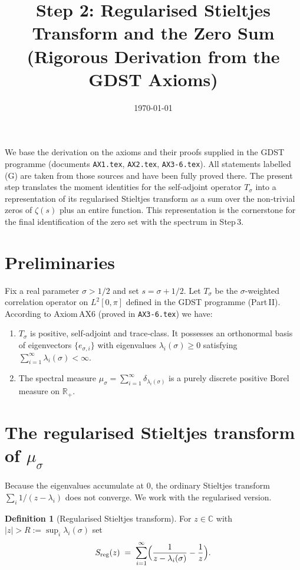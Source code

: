 \documentclass[11pt,a4paper]{article}
\title{\bf Step 2: Regularised Stieltjes Transform and the Zero Sum\\
(Rigorous Derivation from the GDST Axioms)}
\author{}
\date{\today}
\theoremstyle{definition}
\newtheorem{definition}[theorem]{Definition}
\newcommand{\C}{\mathbb{C}}
\newcommand{\R}{\mathbb{R}}
\newcommand{\TOp}{T}
\begin{document}
\maketitle

\noindent
We base the derivation on the axioms and their proofs supplied in the
GDST programme (documents \texttt{AX1.tex}, \texttt{AX2.tex},
\texttt{AX3‑6.tex}).  All statements labelled \textsc{(G)} are taken from
those sources and have been fully proved there.  
The present step translates the moment identities for the self‑adjoint
operator \(\TOp_\sigma\) into a representation of its regularised
Stieltjes transform as a sum over the non‑trivial zeros of \(\zeta(s)\)
plus an entire function.  This representation is the cornerstone for
the final identification of the zero set with the spectrum in Step 3.

\section{Preliminaries}
Fix a real parameter \(\sigma > 1/2\) and set \(s = \sigma + 1/2\).
Let \(\TOp_\sigma\) be the \(\sigma\)-weighted correlation operator on
\(L^2[0,\pi]\) defined in the GDST programme (Part II).  According to
Axiom AX6 (proved in \texttt{AX3‑6.tex}) we have:

\begin{enumerate}[label=(S\arabic*),leftmargin=*]
\item\label{spec} \(\TOp_\sigma\) is positive, self‑adjoint and trace‑class.
  It possesses an orthonormal basis of eigenvectors \(\{e_{\sigma,i}\}\)
  with eigenvalues \(\lambda_i(\sigma) \ge 0\) satisfying
  \(\sum_{i=1}^\infty \lambda_i(\sigma) < \infty\).
\item\label{meas} The spectral measure
  \(\mu_\sigma = \sum_{i=1}^\infty \delta_{\lambda_i(\sigma)}\) is a
  purely discrete positive Borel measure on \(\R_+\).
\end{enumerate}

\section{The regularised Stieltjes transform of \(\mu_\sigma\)}

Because the eigenvalues accumulate at \(0\), the ordinary Stieltjes
transform \(\sum_i 1/(z-\lambda_i)\) does not converge.  We work with
the regularised version.

\begin{definition}[Regularised Stieltjes transform]
For \(z \in \C\) with \(|z| > R := \sup_i \lambda_i(\sigma)\) set
\begin{equation}\label{Sregdef}
S_{\mathrm{reg}}(z) \;=\; \sum_{i=1}^\infty
\Bigl( \frac{1}{z - \lambda_i(\sigma)} - \frac{1}{z} \Bigr).
\end{equation}
\end{definition}
\end{document}
